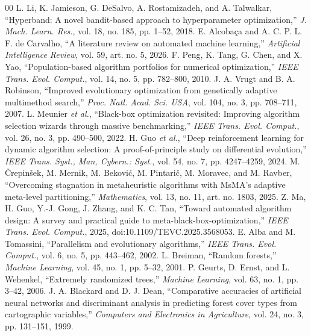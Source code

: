 \documentclass[conference]{IEEEtran}
\begin{document}
\begin{thebibliography}{00}
 L. Li, K. Jamieson, G. DeSalvo, A. Rostamizadeh, and A. Talwalkar, ``Hyperband: A novel bandit-based approach to hyperparameter optimization,'' \textit{J. Mach. Learn. Res.}, vol. 18, no. 185, pp. 1--52, 2018.
 E. Alcoba\c{c}a and A. C. P. L. F. de Carvalho, ``A literature review on automated machine learning,'' \textit{Artificial Intelligence Review}, vol. 59, art. no. 5, 2026.
 F. Peng, K. Tang, G. Chen, and X. Yao, ``Population-based algorithm portfolios for numerical optimization,'' \textit{IEEE Trans. Evol. Comput.}, vol. 14, no. 5, pp. 782--800, 2010.
 J. A. Vrugt and B. A. Robinson, ``Improved evolutionary optimization from genetically adaptive multimethod search,'' \textit{Proc. Natl. Acad. Sci. USA}, vol. 104, no. 3, pp. 708--711, 2007.
 L. Meunier \textit{et al.}, ``Black-box optimization revisited: Improving algorithm selection wizards through massive benchmarking,'' \textit{IEEE Trans. Evol. Comput.}, vol. 26, no. 3, pp. 490--500, 2022.
 H. Guo \textit{et al.}, ``Deep reinforcement learning for dynamic algorithm selection: A proof-of-principle study on differential evolution,'' \textit{IEEE Trans. Syst., Man, Cybern.: Syst.}, vol. 54, no. 7, pp. 4247--4259, 2024.
 M. \v{C}repin\v{s}ek, M. Mernik, M. Bekovi\'{c}, M. Pintari\v{c}, M. Moravec, and M. Ravber, ``Overcoming stagnation in metaheuristic algorithms with MsMA's adaptive meta-level partitioning,'' \textit{Mathematics}, vol. 13, no. 11, art. no. 1803, 2025.
 Z. Ma, H. Guo, Y.-J. Gong, J. Zhang, and K. C. Tan, ``Toward automated algorithm design: A survey and practical guide to meta-black-box-optimization,'' \textit{IEEE Trans. Evol. Comput.}, 2025, doi:10.1109/TEVC.2025.3568053.
 E. Alba and M. Tomassini, ``Parallelism and evolutionary algorithms,'' \textit{IEEE Trans. Evol. Comput.}, vol. 6, no. 5, pp. 443--462, 2002.
 L. Breiman, ``Random forests,'' \textit{Machine Learning}, vol. 45, no. 1, pp. 5--32, 2001.
 P. Geurts, D. Ernst, and L. Wehenkel, ``Extremely randomized trees,'' \textit{Machine Learning}, vol. 63, no. 1, pp. 3--42, 2006.
 J. A. Blackard and D. J. Dean, ``Comparative accuracies of artificial neural networks and discriminant analysis in predicting forest cover types from cartographic variables,'' \textit{Computers and Electronics in Agriculture}, vol. 24, no. 3, pp. 131--151, 1999.

\end{thebibliography}
\end{document}
